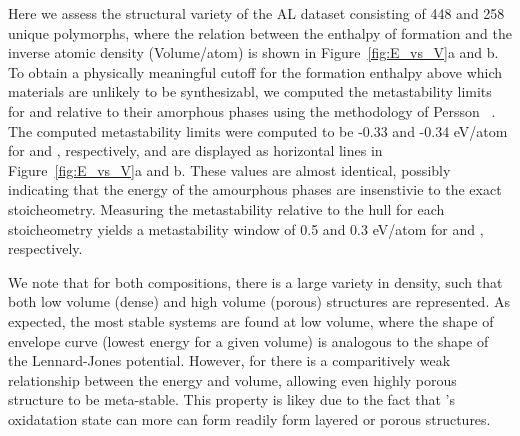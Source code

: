 Here we assess the structural variety of the AL dataset consisting of 448 \IrOtwo and 258 \IrOthree unique polymorphs,
where the relation between the enthalpy of formation and the inverse atomic density (Volume/atom) is shown in Figure~\ref{fig:E_vs_V}a and b.
%
To obtain a physically meaningful cutoff for the formation enthalpy above which materials are unlikely to be synthesizabl, we computed the metastability limits for \IrOtwo and \IrOthree relative to their amorphous phases using the methodology of Persson ~\cite{Aykol2018}.
%
The computed metastability limits were computed to be -0.33 and -0.34 eV/atom for \IrOtwo and \IrOthree, respectively,
and are displayed as horizontal lines in Figure~\ref{fig:E_vs_V}a and b.
%
These values are almost identical, possibly indicating that the energy of the amourphous phases are insenstivie to the exact stoicheometry.
%
Measuring the metastability relative to the hull for each stoicheometry yields a metastability window of 0.5 and 0.3 eV/atom for \IrOtwo and \IrOthree, respectively.


We note that for both compositions,
there is a large variety in density,
such that both low volume (dense) and high volume (porous) structures are represented.
%
As expected, the most stable systems are found at low volume,
where the shape of envelope curve (lowest energy for a given volume) is analogous to the shape of the Lennard-Jones potential.
%
However, for \IrOthree there is a comparitively weak relationship between the energy and volume,
allowing even highly porous structure to be meta-stable.
%
This property is likey due to the fact that \IrOthree's oxidatation state can more can form readily form layered or porous structures.


